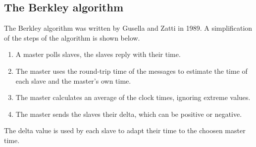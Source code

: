 \subsection{The Berkley algorithm}
The Berkley algorithm was written by Gusella and Zatti in 1989. A simplification of the steps of the algorithm is shown below. 

\begin{enumerate}
\item A master polls slaves, the slaves reply with their time.
\item The master uses the round-trip time of the messages to estimate the time of each slave and the master's own time.
\item The master calculates an average of the clock times, ignoring extreme values.
\item The master sends the slaves their delta, which can be positive or negative. 
\end{enumerate}
\label{fig:mifare-auth}

The delta value is used by each slave to adapt their time to the choosen master time. 


